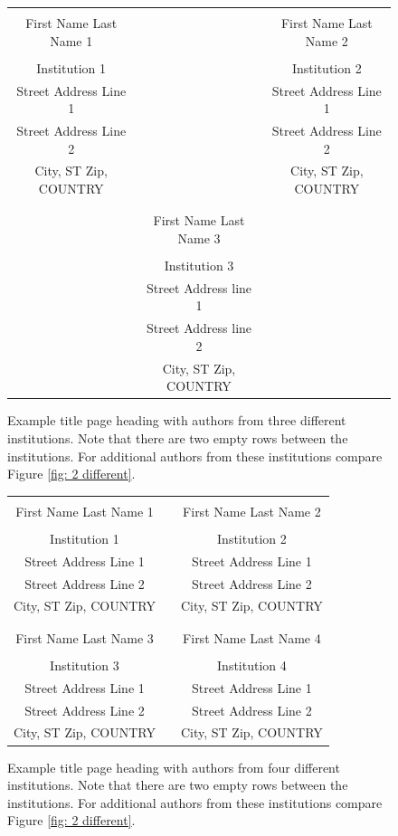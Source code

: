 \documentclass{wscpaperproc}
\theoremstyle{wsc}
\begin{document}
\begin{figure}[htb]
{
\centering
\begin{tabular}{ccc}
\phantom{This adjusts spacing - ignore} & \phantom{This adjusts spacing - ignore} & \phantom{This adjusts spacing - ignore} \\
First Name Last Name 1 & & First Name Last Name 2 \\
\\
Institution 1 & & Institution 2 \\
Street Address Line 1 & & Street Address Line 1 \\
Street Address Line 2 & & Street Address Line 2 \\
City, ST Zip, COUNTRY & & City, ST Zip, COUNTRY \\
\\
\\
& First Name Last Name 3 \\
\\
& Institution 3\\
& Street Address line 1 \\
& Street Address line 2 \\
& City, ST Zip, COUNTRY
\end{tabular}
\caption{Example title page heading with authors from three different institutions. Note that there are two empty rows between the institutions. For additional authors from these institutions compare Figure \ref{fig: 2 different}. \label{fig: 3 different}}
}
\end{figure}

\begin{figure}[htb]
{
\centering
\begin{tabular}{ccc}
\phantom{Adjust spacing using these entries} & \phantom{intermediate space} & \phantom{Adjust spacing using these entries} \\
First Name Last Name 1 & & First Name Last Name 2 \\
\\
Institution 1 & & Institution 2 \\
Street Address Line 1 & & Street Address Line 1 \\
Street Address Line 2 & & Street Address Line 2 \\
City, ST Zip, COUNTRY & & City, ST Zip, COUNTRY \\
\\ \\
First Name Last Name 3 & & First Name Last Name 4 \\
\\
Institution 3 & & Institution 4 \\
Street Address Line 1 & & Street Address Line 1 \\
Street Address Line 2 & & Street Address Line 2 \\
City, ST Zip, COUNTRY & & City, ST Zip, COUNTRY
\end{tabular}
\caption{Example title page heading with authors from four different institutions. Note that there are two empty rows between the institutions. For additional authors from these institutions compare Figure \ref{fig: 2 different}. \label{fig: 4 different}}
}
\end{figure}
\end{document}
